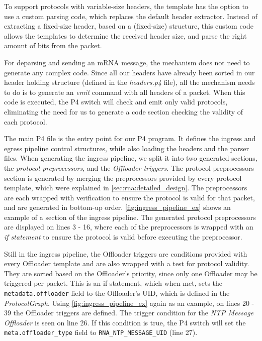 To support protocols with variable-size headers, the template has the option to use a custom parsing code, which replaces the default header extractor. Instead of extracting a fixed-size header, based on a (fixed-size) structure, this custom code allows the templates to determine the received header size, and parse the right amount of bits from the packet.

For deparsing and sending an mRNA message, the mechanism does not need to generate any complex code. Since all our headers have already been sorted in our header holding structure (defined in the \textit{headers.p4} file), all the mechanism needs to do is to generate an \textit{emit} command with all headers of a packet. When this code is executed, the P4 switch will check and emit only valid protocols, eliminating the need for us to generate a code section checking the validity of each protocol.

The main P4 file is the entry point for our P4 program. It defines the ingress and egress pipeline control structures, while also loading the headers and the parser files. When generating the ingress pipeline, we split it into two generated sections, the \textit{protocol preprocessors}, and the \textit{Offloader triggers}. The protocol preprocessors section is generated by merging the preprocessors provided by every protocol template, which were explained in \autoref{sec:rna:detailed_design}. The preprocessors are each wrapped with verification to ensure the protocol is valid for that packet, and are generated in bottom-up order. \autoref{fig:ingress_pipeline_ex} shows an example of a section of the ingress pipeline. The generated protocol preprocessors are displayed on lines 3 - 16, where each of the preprocessors is wrapped with an \textit{if statement} to ensure the protocol is valid before executing the preprocessor.

Still in the ingress pipeline, the Offloader triggers are conditions provided with every Offloader template and are also wrapped with a test for protocol validity. They are sorted based on the Offloader's priority, since only one Offloader may be triggered per packet. This is an if statement, which when met, sets the \texttt{metadata.offloader} field to the Offloader's UID, which is defined in the \textit{ProtocolGraph}. Using \autoref{fig:ingress_pipeline_ex} again as an example, on lines 20 - 39 the Offloader triggers are defined. The trigger condition for the \textit{NTP Message Offloader} is seen on line 26. If this condition is true, the P4 switch will set the \texttt{meta.offloader\_type} field to \texttt{RNA\_NTP\_MESSAGE\_UID} (line 27).


